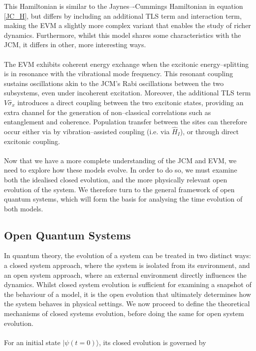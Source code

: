 \documentclass[12pt]{article}
\begin{document}
This Hamiltonian is similar to the Jaynes–-Cummings Hamiltonian in equation \eqref{JC_H}, but differs by including an additional TLS term and interaction term, making the EVM a slightly more complex variant that enables the study of richer dynamics. Furthermore, whilst this model shares some characteristics with the JCM, it differs in other, more interesting ways. \\
\\
The EVM exhibits coherent energy exchange when the excitonic energy--splitting is in resonance with the vibrational mode frequency. This resonant coupling sustains oscillations akin to the JCM's Rabi oscillations between the two subsystems, even under incoherent excitation. Moreover, the additional TLS term $V\hat{\sigma}_x$ introduces a direct coupling between the two excitonic states, providing an extra channel for the generation of non--classical correlations such as entanglement and coherence. Population transfer between the sites can therefore occur either via by vibration--assisted coupling (i.e. via $\hat{H}_I$), or through direct excitonic coupling.\\
\\
Now that we have a more complete understanding of the JCM and EVM, we need to explore how these models evolve. In order to do so, we must examine both the idealised closed evolution, and the more physically relevant open evolution of the system. We therefore turn to the general framework of open quantum systems, which will form the basis for analysing the time evolution of both models.

\newpage
\subsection{Open Quantum Systems} \label{sec:theory_sub_OQS}

In quantum theory, the evolution of a system can be treated in two distinct ways: a closed system approach, where the system is isolated from its environment, and an open system approach, where an external environment directly influences the dynamics. Whilst closed system evolution is sufficient for examining a snapshot of the behaviour of a model, it is the open evolution that ultimately determines how the system behaves in physical settings. We now proceed to define the theoretical mechanisms of closed systems evolution, before doing the same for open system evolution.\\
\\
For an initial state $|\psi (t=0)\rangle$, its closed evolution is governed by
\end{document}
